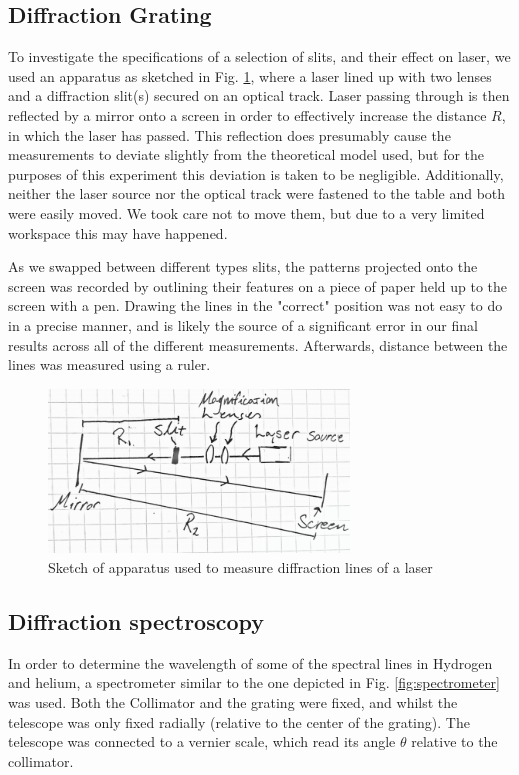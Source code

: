 \documentclass[11pt,a4paper]{article}
\begin{document}
    \subsection{Diffraction Grating\label{exp:diffgrat}}
      To investigate the specifications of a selection of slits, and their effect on laser, we used an apparatus as sketched in Fig. \ref{fig:laser}, where a laser lined up with two lenses and a diffraction slit(s) secured on an optical track. Laser passing through is then reflected by a mirror onto a screen in order to effectively increase the distance $R$, in which the laser has passed. This reflection does presumably cause the measurements to deviate slightly from the theoretical model used, but for the purposes of this experiment this deviation is taken to be negligible. 
      Additionally, neither the laser source nor the optical track were fastened to the table and both were easily moved. We took care not to move them, but due to a very limited workspace this may have happened.

      As we swapped between different types slits, the patterns projected onto the screen was recorded by outlining their features on a piece of paper held up to the screen with a pen. Drawing the lines in the "correct" position was not easy to do in a precise manner, and is likely the source of a significant error in our final results across all of the different measurements. Afterwards, distance between the lines was measured using a ruler.

    \begin{figure}[H]
        \center
        \includegraphics[width=8cm]{scripts/figs/diff_diagram.png}
        \caption{Sketch of apparatus used to measure diffraction lines of a laser}
        \label{fig:laser}
    \end{figure}

    \subsection{Diffraction spectroscopy}

    In order to determine the wavelength of some of the spectral lines in Hydrogen and helium, a spectrometer similar to the one depicted in Fig. \ref{fig:spectrometer} was used. Both the Collimator and the grating were fixed, and whilst the telescope was only fixed radially (relative to the center of the grating). The telescope was connected to a vernier scale, which read its angle $\theta$ relative to the collimator.
\end{document}
